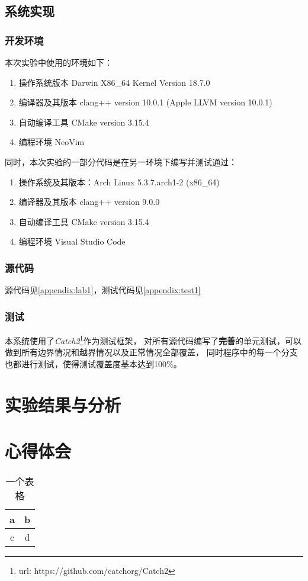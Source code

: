 \documentclass[format=draft,language=chinese,category=academic-report]{hustreport}
\begin{document}
\subsection{系统实现}
\subsubsection{开发环境}
本次实验中使用的环境如下：
\begin{enumerate}
    \item 操作系统版本 Darwin X86\_64 Kernel Version 18.7.0
    \item 编译器及其版本 clang++ version 10.0.1 (Apple LLVM version 10.0.1)
    \item 自动编译工具 CMake version 3.15.4
    \item 编程环境 NeoVim
\end{enumerate}
同时，本次实验的一部分代码是在另一环境下编写并测试通过：
\begin{enumerate}
    \item 操作系统及其版本：Arch Linux 5.3.7.arch1-2 (x86\_64)
    \item 编译器及其版本 clang++ version 9.0.0
    \item 自动编译工具 CMake version 3.15.4
    \item 编程环境 Visual Studio Code
\end{enumerate}
\subsubsection{源代码}
源代码见\autoref{appendix:lab1}，测试代码见\autoref{appendix:test1}
\subsubsection{测试}
本系统使用了\textit{Catch2}\footnote{url: https://github.com/catchorg/Catch2}作为测试框架，
对所有源代码编写了\textbf{完善}的单元测试，可以做到所有边界情况和越界情况以及正常情况全部覆盖，
同时程序中的每一个分支也都进行测试，使得测试覆盖度基本达到100\%。
\section{实验结果与分析}\label{sec:4}
\section{心得体会}\label{sec:5}

\begin{table}[!h]
\centering
\caption{一个表格}\label{tab:1}
\begin{tabular}{|c|c|}
\hline
a & b \\
\hline
c & d \\
\hline
\end{tabular}
\end{table}
\end{document}
